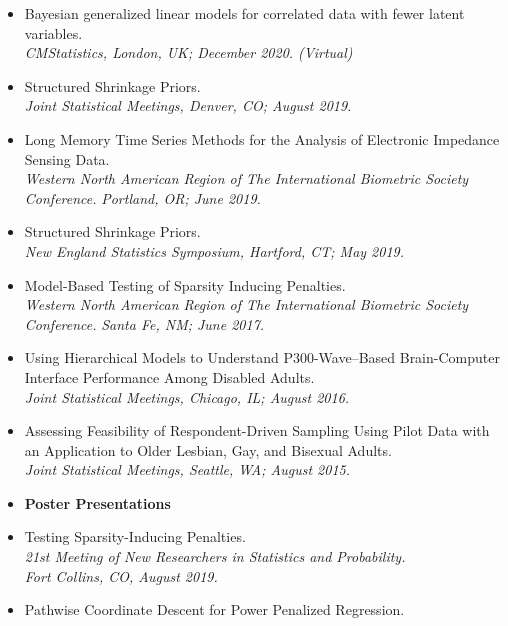 \documentclass[11pt]{article}
\newcommand{\tab}{\hspace*{2em}}
\begin{document}
\begin{itemize}
	\item[] Bayesian generalized linear models for correlated data with fewer latent variables. \\
	\tab \emph{CMStatistics, London, UK; December 2020. (Virtual) } \vspace{-2mm}
	\item[] Structured Shrinkage Priors. \\
	\tab \emph{Joint Statistical Meetings, Denver, CO; August 2019.} \vspace{-2mm}
	\item[] Long Memory Time Series Methods for the Analysis of Electronic Impedance Sensing Data. \\
	\tab \emph{Western North American Region of The International Biometric Society Conference.}
	\tab \emph{Portland, OR; June 2019.} \vspace{-2mm}
	\item[] Structured Shrinkage Priors. \\
	\tab \emph{New England Statistics Symposium, Hartford, CT; May 2019.} \vspace{-2mm}
	\item[] Model-Based Testing of Sparsity Inducing Penalties. \\
	\tab \emph{Western North American Region of The International Biometric Society Conference.}
	\tab \emph{Santa Fe, NM; June 2017.} \vspace{-2mm}
	\item[] Using Hierarchical Models to Understand P300-Wave--Based Brain-Computer Interface Performance Among Disabled Adults. \\
	\tab \emph{Joint Statistical Meetings, Chicago, IL; August 2016.} \vspace{-2mm}
	\item[] Assessing Feasibility of Respondent-Driven Sampling Using Pilot Data with an Application to Older Lesbian, Gay, and Bisexual Adults. \\
	\tab \emph{Joint Statistical Meetings, Seattle, WA; August 2015.} 
	\item[] \textbf{Poster Presentations}\vspace{-2mm}
	\item[] Testing Sparsity-Inducing Penalties. \\
	\tab \emph{21st Meeting of New Researchers in 
Statistics and Probability.}\\ 
	\tab \emph{Fort Collins, CO, August 2019.} \vspace{-2mm}
	\item[] Pathwise Coordinate Descent for Power Penalized Regression. \\

\end{itemize}
\end{document}
